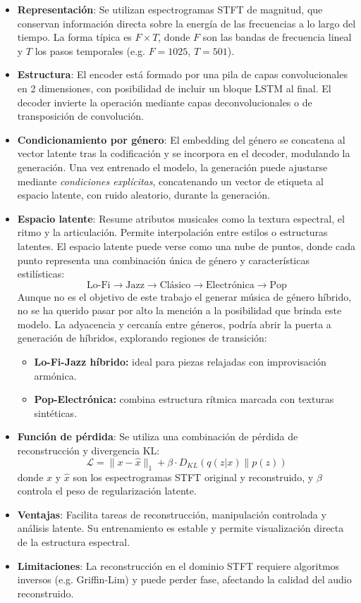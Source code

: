 \begin{itemize}
  \item \textbf{Representación}: Se utilizan espectrogramas STFT de magnitud, que conservan información directa sobre la energía de las frecuencias a lo largo del tiempo. La forma típica es $F \times T$, donde $F$ son las bandas de frecuencia lineal y $T$ los pasos temporales (e.g. $F=1025$, $T=501$).
  \item \textbf{Estructura}: El encoder está formado por una pila de capas convolucionales en 2 dimensiones, con posibilidad de incluir un bloque LSTM al final. El decoder invierte la operación mediante capas deconvolucionales o de transposición de convolución.
  \item \textbf{Condicionamiento por género}: El embedding del género se concatena al vector latente tras la codificación y se incorpora en el decoder, modulando la generación.
  Una vez entrenado el modelo, la generación puede ajustarse mediante \textit{condiciones explícitas}, concatenando un vector de etiqueta al espacio latente, con ruido aleatorio, durante la generación.
  \item \textbf{Espacio latente}: Resume atributos musicales como la textura espectral, el ritmo y la articulación. Permite interpolación entre estilos o estructuras latentes.
  El espacio latente puede verse como una nube de puntos, donde cada punto representa una combinación única de género y características estilísticas:
    \[
    \text{Lo-Fi} \longrightarrow \text{Jazz} \longrightarrow \text{Clásico} \longrightarrow \text{Electrónica} \longrightarrow \text{Pop}
    \]
    Aunque no es el objetivo de este trabajo el generar música de género híbrido, no se ha querido pasar por alto la mención a la posibilidad que brinda este modelo.
    La adyacencia y cercanía entre géneros, podría abrir la puerta a generación de híbridos, explorando regiones de transición:
    \begin{itemize}
        \item \textbf{Lo-Fi-Jazz híbrido:} ideal para piezas relajadas con improvisación armónica.
        \item \textbf{Pop-Electrónica:} combina estructura rítmica marcada con texturas sintéticas.
    \end{itemize}
  \item \textbf{Función de pérdida}: Se utiliza una combinación de pérdida de reconstrucción y divergencia KL:
    \[
    \mathcal{L} = \|x - \hat{x}\|_1 + \beta \cdot D_{KL}(q(z|x) \| p(z))
    \]
    donde $x$ y $\hat{x}$ son los espectrogramas STFT original y reconstruido, y $\beta$ controla el peso de regularización latente.
  \item \textbf{Ventajas}: Facilita tareas de reconstrucción, manipulación controlada y análisis latente. Su entrenamiento es estable y permite visualización directa de la estructura espectral.
  \item \textbf{Limitaciones}: La reconstrucción en el dominio STFT requiere algoritmos inversos (e.g. Griffin-Lim) y puede perder fase, afectando la calidad del audio reconstruido.
\end{itemize}

